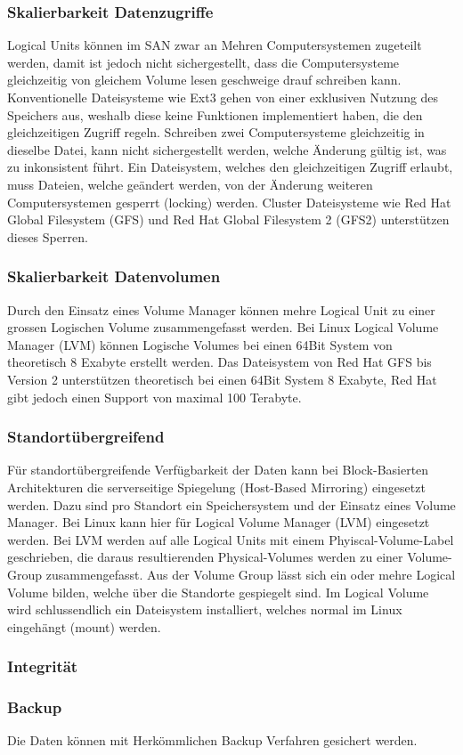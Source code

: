 \subsubsection{Skalierbarkeit Datenzugriffe}
Logical Units können im SAN zwar an Mehren Computersystemen zugeteilt werden, damit ist jedoch nicht sichergestellt, dass die Computersysteme gleichzeitig von gleichem Volume lesen geschweige drauf schreiben kann. Konventionelle Dateisysteme wie Ext3 gehen von einer exklusiven Nutzung des Speichers aus, weshalb diese keine Funktionen implementiert haben, die den gleichzeitigen Zugriff regeln. Schreiben zwei Computersysteme gleichzeitig in dieselbe Datei, kann nicht sichergestellt werden, welche Änderung gültig ist, was zu inkonsistent führt. Ein Dateisystem, welches den gleichzeitigen Zugriff erlaubt, muss Dateien, welche geändert werden, von der Änderung weiteren Computersystemen gesperrt (locking) werden. Cluster Dateisysteme wie Red Hat Global Filesystem (GFS) und Red Hat Global Filesystem 2 (GFS2) unterstützen dieses Sperren.



\subsubsection*{Skalierbarkeit Datenvolumen}
Durch den Einsatz eines Volume Manager können mehre Logical Unit zu einer grossen Logischen Volume zusammengefasst werden. Bei Linux Logical Volume Manager (LVM) können Logische Volumes bei einen 64Bit System von theoretisch 8 Exabyte erstellt werden. Das Dateisystem von Red Hat GFS bis Version 2 unterstützen theoretisch bei einen 64Bit System 8 Exabyte, Red Hat gibt jedoch einen Support von maximal 100 Terabyte.\cite{Levine2011}


\subsubsection{Standortübergreifend}
Für standortübergreifende Verfügbarkeit der Daten kann bei Block-Basierten Architekturen die serverseitige Spiegelung (Host-Based Mirroring) eingesetzt werden. Dazu sind pro Standort ein Speichersystem und der Einsatz eines Volume Manager. Bei Linux kann hier für Logical Volume Manager (LVM) eingesetzt werden. Bei LVM werden auf alle Logical Units mit einem Phyiscal-Volume-Label geschrieben, die daraus resultierenden Physical-Volumes werden zu einer Volume-Group zusammengefasst. Aus der Volume Group lässt sich ein oder mehre Logical Volume bilden, welche über die Standorte gespiegelt sind. Im Logical Volume 
wird schlussendlich ein Dateisystem installiert, welches normal im Linux eingehängt (mount) werden.

\subsubsection{Integrität}


\subsubsection{Backup}
Die Daten können mit Herkömmlichen Backup Verfahren gesichert werden.





